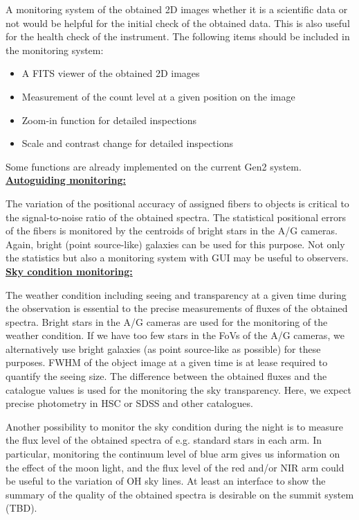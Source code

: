 \documentclass[a4paper]{article}
\begin{document}
A monitoring system of the obtained 2D images whether it is a scientific data or not would be helpful for the initial check of the obtained data. This is also useful for the health check of the instrument. The following items should be included in the monitoring system:\\

\begin{itemize}
\item A FITS viewer of the obtained 2D images
\item Measurement of the count level at a given position on the image
\item Zoom-in function for detailed inspections
\item Scale and contrast change for detailed inspections
\end{itemize}

Some functions are already implemented on the current Gen2 system.\\

\noindent \underline{\textbf{Autoguiding monitoring:}}
\vspace{5pt}

The variation of the positional accuracy of assigned fibers to objects is critical to the signal-to-noise ratio of the obtained spectra. The statistical positional errors of the fibers is monitored by the centroids of bright stars in the A/G cameras. Again, bright (point source-like) galaxies can be used for this purpose. Not only the statistics but also a monitoring system with GUI may be useful to observers.\\

\noindent \underline{\textbf{Sky condition monitoring:}}
\vspace{5pt}

The weather condition including seeing and transparency at a given time during the observation is essential to the precise measurements of fluxes of the obtained spectra. Bright stars in the A/G cameras are used for the monitoring of the weather condition. If we have too few stars in the FoVs of the A/G cameras, we alternatively use bright galaxies (as point source-like as possible) for these purposes. FWHM of the object image at a given time is at lease required to quantify the seeing size. The difference between the obtained fluxes and the catalogue values is used for the monitoring the sky transparency. Here, we expect precise photometry in HSC or SDSS and other catalogues.

Another possibility to monitor the sky condition during the night is to measure the flux level of the obtained spectra of e.g. standard stars in each arm. In particular, monitoring the continuum level of blue arm gives us information on the effect of the moon light, and the flux level of the red and/or NIR arm could be useful to the variation of OH sky lines. At least an interface to show the summary of the quality of the obtained spectra is desirable on the summit system (TBD).\\
\end{document}
